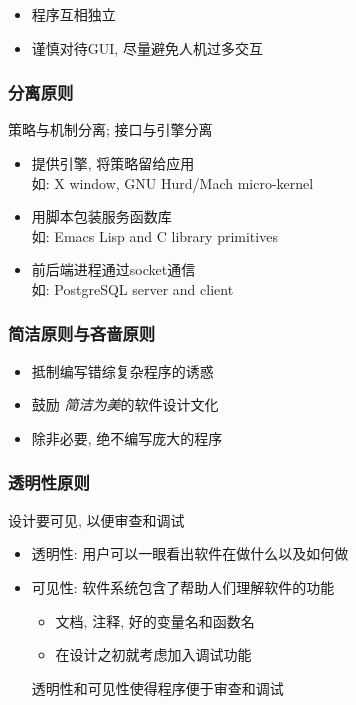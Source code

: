 \documentclass[compress]{beamer}
\begin{document}
\begin{frame}
\begin{itemize}
\item 程序互相独立

\item 谨慎对待GUI, 尽量避免人机过多交互

\end{itemize}
\end{frame}

\begin{frame}
\frametitle{分离原则}
\begin{block}{策略与机制分离; 接口与引擎分离}

\begin{itemize}
\item 提供引擎, 将策略留给应用\\
如: X window, GNU Hurd/Mach micro-kernel

\item 用脚本包装服务函数库\\
如: Emacs Lisp and \alert{C} library primitives

\item 前后端进程通过socket通信 \\
如: PostgreSQL server and client
\end{itemize}
\end{block}

\end{frame}

\begin{frame}
\frametitle{简洁原则与吝啬原则}

\begin{itemize}
\item 抵制编写错综复杂程序的诱惑
\item 鼓励 \emph{简洁为美}的软件设计文化
\item 除非必要, 绝不编写庞大的程序
\end{itemize}
\end{frame}

\begin{frame}
\frametitle{透明性原则}
\begin{block}{设计要可见, 以便审查和调试}

\begin{itemize}
\item 透明性: 用户可以一眼看出软件在做什么以及如何做

\item 可见性: 软件系统包含了帮助人们理解软件的功能
  \begin{itemize}
	\item 文档, 注释, 好的变量名和函数名
	\item 在设计之初就考虑加入调试功能
  \end{itemize}
  透明性和可见性使得程序便于审查和调试
\end{itemize}
\end{block}
\end{frame}
\end{document}
